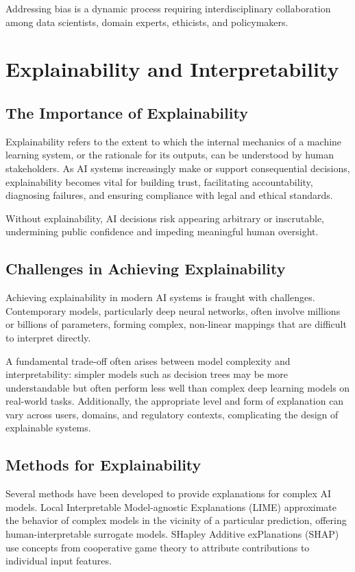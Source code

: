 \documentclass[openany]{book}
\begin{document}
Addressing bias is a dynamic process requiring interdisciplinary collaboration
among data scientists, domain experts, ethicists, and policymakers.

\section{Explainability and Interpretability}

\subsection{The Importance of Explainability}

Explainability refers to the extent to which the internal mechanics of a machine
learning system, or the rationale for its outputs, can be understood by human
stakeholders. As AI systems increasingly make or support consequential
decisions, explainability becomes vital for building trust, facilitating
accountability, diagnosing failures, and ensuring compliance with legal and
ethical standards.

Without explainability, AI decisions risk appearing arbitrary or inscrutable,
undermining public confidence and impeding meaningful human oversight.

\subsection{Challenges in Achieving Explainability}

Achieving explainability in modern AI systems is fraught with challenges.
Contemporary models, particularly deep neural networks, often involve millions
or billions of parameters, forming complex, non-linear mappings that are
difficult to interpret directly.

A fundamental trade-off often arises between model complexity and
interpretability: simpler models such as decision trees may be more
understandable but often perform less well than complex deep learning models on
real-world tasks. Additionally, the appropriate level and form of explanation
can vary across users, domains, and regulatory contexts, complicating the design
of explainable systems.

\subsection{Methods for Explainability}

Several methods have been developed to provide explanations for complex AI
models. Local Interpretable Model-agnostic Explanations (LIME) approximate the
behavior of complex models in the vicinity of a particular prediction, offering
human-interpretable surrogate models. SHapley Additive exPlanations (SHAP) use
concepts from cooperative game theory to attribute contributions to individual
input features.
\end{document}
